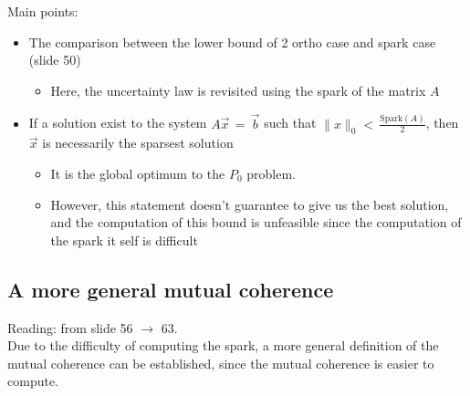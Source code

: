 \documentclass[12pt,a4paper]{book}
\begin{document}
Main points:

\begin{itemize}
    \item The comparison between the lower bound of 2 ortho case and spark case (slide 50)
    
        \begin{itemize}
            \item Here, the uncertainty law is revisited using the spark of the matrix $A$
        \end{itemize}
    
    
    \item If a solution exist to the system $A \Vec{x} \, = \, \Vec{b}$ such that $\lVert x \rVert_0 < \, \displaystyle\frac{\text{Spark}(A)}{2}$, then $\Vec{x}$ is necessarily the sparsest solution
    
        \begin{itemize}
            \item It is the global optimum to the $P_0$ problem.
            
            \item However, this statement doesn't guarantee to give us the best solution, and the computation of this bound is unfeasible since the computation of the spark it self is difficult
        \end{itemize}
    
    
\end{itemize}

\subsection{A more general mutual coherence}

Reading: from slide 56 $\rightarrow$ 63.\\

Due to the difficulty of computing the spark, a more general definition of the mutual coherence can be established, since the mutual coherence is easier to compute.
\end{document}

